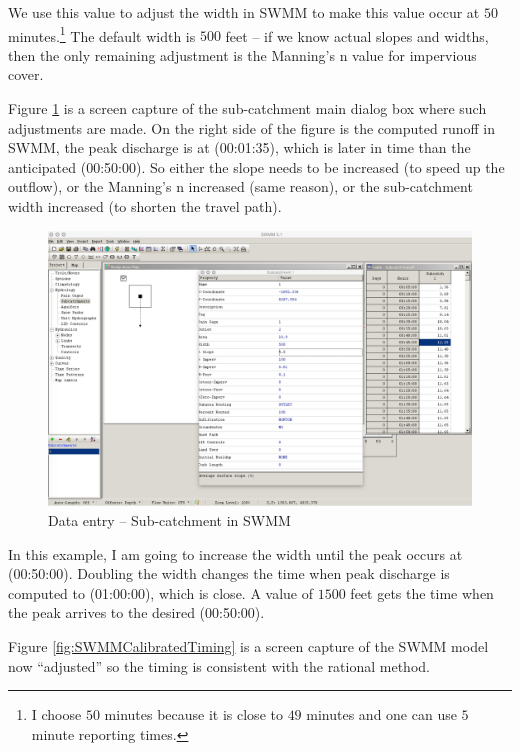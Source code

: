\documentclass[12pt]{article}
\begin{document}
We use this value to adjust the width in SWMM to make this value occur at $50$ minutes.\footnote{I choose $50$ minutes because it is close to $49$ minutes and one can use $5$ minute reporting times.}
The default width is $500$ feet -- if we know actual slopes and widths, then the only remaining adjustment is the Manning's n value for impervious cover.

Figure \ref{fig:SWMMSubCatchment} is a screen capture of the sub-catchment main dialog box where such adjustments are made. 
On the right side of the figure is the computed runoff in SWMM, the peak discharge is at (00:01:35), which is later in time than the anticipated (00:50:00).
So either the slope needs to be increased (to speed up the outflow), or the Manning's n increased (same reason), or the sub-catchment width increased (to shorten the travel path).

\begin{figure}[h!] %
   \centering
   \includegraphics[width=6in]{SWMMSubCatchment.jpg} 
   \caption{Data entry -- Sub-catchment in SWMM}
   \label{fig:SWMMSubCatchment}
\end{figure}

In this example, I am going to increase the width until the peak occurs at (00:50:00).  
Doubling the width changes the time when peak discharge is computed to (01:00:00), which is close.  
A value of $1500$ feet gets the time when the peak arrives to the desired (00:50:00).

Figure \ref{fig:SWMMCalibratedTiming} is a screen capture of the SWMM model now ``adjusted'' so the timing is consistent with the rational method.
\end{document}
